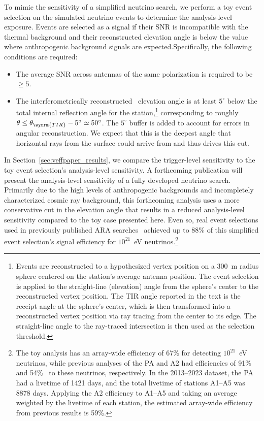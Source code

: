       To mimic the sensitivity of a simplified neutrino search, we perform a toy event selection on the simulated neutrino events to determine the analysis-level exposure.
      Events are selected as a signal if their SNR is incompatible with the thermal background and their reconstructed elevation angle is below the value where anthropogenic background signals are expected.Specifically, the following conditions are required: 
      \begin{itemize}
        \item The average SNR across antennas of the same polarization is required to be $\geq5$.
        \item The interferometrically reconstructed~\citep{ara_testbed} elevation angle is at least $5^\circ$ below the total internal reflection angle for the station,\footnote{
          Events are reconstructed to a hypothesized vertex position on a $300$~m radius sphere centered on the station's average antenna position.
          The event selection is applied to the straight-line (elevation) angle from the sphere's center to the reconstructed vertex position.
          The TIR angle reported in the text is the receipt angle at the sphere's center, which is then transformed into a reconstructed vertex position via ray tracing from the center to its edge.
          The straight-line angle to the ray-traced intersection is then used as the selection threshold.
        } corresponding to roughly $\theta \leq \theta_{\symrm{TIR}} - 5^\circ \simeq 50^{\circ}$.
        The $5^{\circ}$ buffer is added to account for errors in angular reconstruction.
        We expect that this is the deepest angle that horizontal rays from the surface could arrive from and thus drives this cut.
      \end{itemize}
  
      \noindent In Section~\ref{sec:veffpaper_results}, we compare the trigger-level sensitivity to the toy event selection's analysis-level sensitivity.
      A forthcoming publication will present the analysis-level sensitivity of a fully developed neutrino search.
      Primarily due to the high levels of anthropogenic backgrounds and incompletely characterized cosmic ray background, this forthcoming analysis uses a more conservative cut in the elevation angle that results in a reduced analysis-level sensitivity compared to the toy case presented here.
      Even so, real event selections used in previously published ARA searches~\citep{ara_a23,ara_pa_analysis} achieved up to 88\% of this simplified event selection's signal efficiency for $10^{21}$~eV neutrinos.\footnote{
          The toy analysis has an array-wide efficiency of 67\% for detecting $10^{21}$~eV neutrinos, while previous analyses of the PA and A2 had efficiencies of 91\%~\citep{ara_pa_analysis} and 54\%~\citep{ara_a23} to these neutrinos, respectively.
          In the 2013--2023 dataset, the PA had a livetime of 1421 days, and the total livetime of stations A1--A5 was 8878 days.
          Applying the A2 efficiency to A1--A5 and taking an average weighted by the livetime of each station, the estimated array-wide efficiency from previous results is 59\%.
      }

